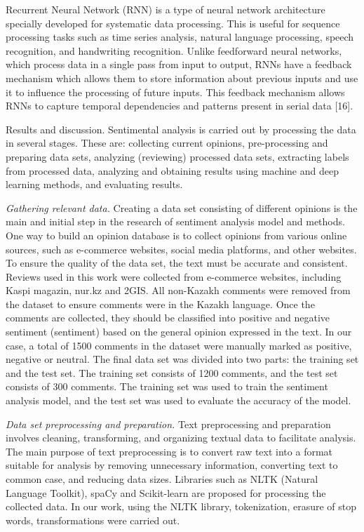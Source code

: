 \begin{multicols}{2}
Recurrent Neural Network (RNN) is a type of neural network architecture
specially developed for systematic data processing. This is useful for
sequence processing tasks such as time series analysis, natural language
processing, speech recognition, and handwriting recognition. Unlike
feedforward neural networks, which process data in a single pass from
input to output, RNNs have a feedback mechanism which allows them to
store information about previous inputs and use it to influence the
processing of future inputs. This feedback mechanism allows RNNs to
capture temporal dependencies and patterns present in serial data
{[}16{]}.

Results and discussion. Sentimental analysis is carried out by
processing the data in several stages. These are: collecting current
opinions, pre-processing and preparing data sets, analyzing (reviewing)
processed data sets, extracting labels from processed data, analyzing
and obtaining results using machine and deep learning methods, and
evaluating results.

\emph{Gathering relevant data.} Creating a data set consisting of
different opinions is the main and initial step in the research of
sentiment analysis model and methods. One way to build an opinion
database is to collect opinions from various online sources, such as
e-commerce websites, social media platforms, and other websites. To
ensure the quality of the data set, the text must be accurate and
consistent. Reviews used in this work were collected from e-commerce
websites, including Kaspi magazin, nur.kz and 2GIS. All non-Kazakh
comments were removed from the dataset to ensure comments were in the
Kazakh language. Once the comments are collected, they should be
classified into positive and negative sentiment (sentiment) based on the
general opinion expressed in the text. In our case, a total of 1500
comments in the dataset were manually marked as positive, negative or
neutral. The final data set was divided into two parts: the training set
and the test set. The training set consists of 1200 comments, and the
test set consists of 300 comments. The training set was used to train
the sentiment analysis model, and the test set was used to evaluate the
accuracy of the model.

\emph{Data set preprocessing and preparation.} Text preprocessing and
preparation involves cleaning, transforming, and organizing textual data
to facilitate analysis. The main purpose of text preprocessing is to
convert raw text into a format suitable for analysis by removing
unnecessary information, converting text to common case, and reducing
data sizes. Libraries such as NLTK (Natural Language Toolkit), spaCy and
Scikit-learn are proposed for processing the collected data. In our
work, using the NLTK library, tokenization, erasure of stop words,
transformations were carried out.


\end{multicols}
